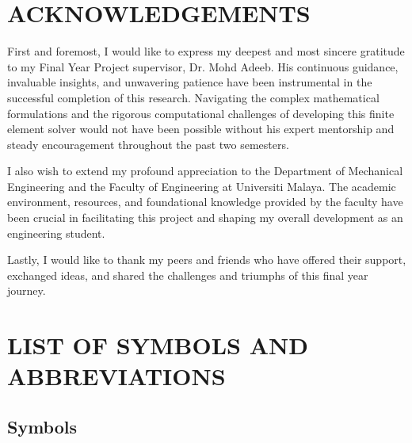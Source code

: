 \documentclass[12pt, a4paper]{report}
\renewcommand{\contentsname}{Table of Contents}
\begin{document}
\newpage
\chapter*{ACKNOWLEDGEMENTS}

\begin{doublespacing}
First and foremost, I would like to express my deepest and most sincere gratitude to my Final Year Project supervisor, Dr. Mohd Adeeb. His continuous guidance, invaluable insights, and unwavering patience have been instrumental in the successful completion of this research. Navigating the complex mathematical formulations and the rigorous computational challenges of developing this finite element solver would not have been possible without his expert mentorship and steady encouragement throughout the past two semesters.

I also wish to extend my profound appreciation to the Department of Mechanical Engineering and the Faculty of Engineering at Universiti Malaya. The academic environment, resources, and foundational knowledge provided by the faculty have been crucial in facilitating this project and shaping my overall development as an engineering student.

Lastly, I would like to thank my peers and friends who have offered their support, exchanged ideas, and shared the challenges and triumphs of this final year journey.
\end{doublespacing}

\clearpage
\pdfbookmark[0]{\contentsname}{toc}
\tableofcontents

\clearpage
{}
\listoffigures

\clearpage
{}
\listoftables

\clearpage
\chapter*{LIST OF SYMBOLS AND ABBREVIATIONS}

\section*{Symbols}
\end{document}
